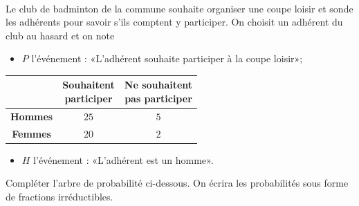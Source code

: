 \documentclass[11pt]{article}
\begin{document}
\begin{exo}~\\
\begin{minipage}{.5\textwidth}
  Le club de badminton de la commune souhaite organiser une coupe loisir et
  sonde les adhérents pour savoir s'ils comptent y participer. On choisit un
  adhérent du club au hasard et on note
  \begin{itemize}
    \item $P$ l'événement : «L'adhérent souhaite participer à la coupe loisir»;
  \end{itemize}
\end{minipage}
\begin{minipage}{.5\textwidth}
\begin{center}
\renewcommand{\arraystretch}{2}
\begin{tabular}{|c|c|c|}
  \cline{2-3}
  \multicolumn{1}{c|}{} & \makecell{\textbf{Souhaitent}\\\textbf{participer}} &
  \makecell{\textbf{Ne souhaitent}\\\textbf{pas participer}} \\
  \hline
  \textbf{Hommes} & $25$ & $5$ \\
  \hline
  \textbf{Femmes} & $20$ & $2$ \\
  \hline
\end{tabular}
\end{center}
\end{minipage}
\begin{itemize}
  \item $H$ l'événement : «L'adhérent est un homme».
\end{itemize}
Compléter l'arbre de probabilité ci-dessous. On écrira les probabilités sous
forme de fractions irréductibles.
    \begin{center}
\end{center}
\end{exo}
\end{document}
